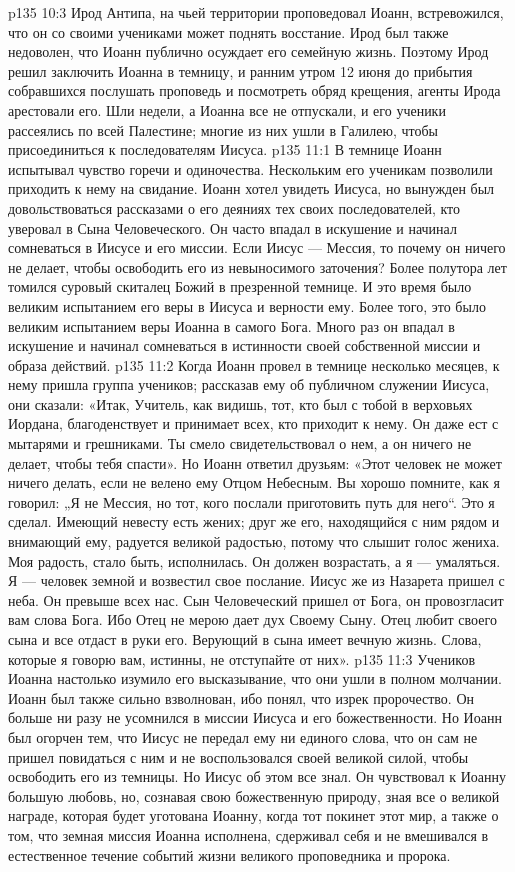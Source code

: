 \vs p135 10:3 Ирод Антипа, на чьей территории проповедовал Иоанн, встревожился, что он со своими учениками может поднять восстание. Ирод был также недоволен, что Иоанн публично осуждает его семейную жизнь. Поэтому Ирод решил заключить Иоанна в темницу, и ранним утром 12 июня до прибытия собравшихся послушать проповедь и посмотреть обряд крещения, агенты Ирода арестовали его. Шли недели, а Иоанна все не отпускали, и его ученики рассеялись по всей Палестине; многие из них ушли в Галилею, чтобы присоединиться к последователям Иисуса.
\vs p135 11:1 В темнице Иоанн испытывал чувство горечи и одиночества. Нескольким его ученикам позволили приходить к нему на свидание. Иоанн хотел увидеть Иисуса, но вынужден был довольствоваться рассказами о его деяниях тех своих последователей, кто уверовал в Сына Человеческого. Он часто впадал в искушение и начинал сомневаться в Иисусе и его миссии. Если Иисус --- Мессия, то почему он ничего не делает, чтобы освободить его из невыносимого заточения? Более полутора лет томился суровый скиталец Божий в презренной темнице. И это время было великим испытанием его веры в Иисуса и верности ему. Более того, это было великим испытанием веры Иоанна в самого Бога. Много раз он впадал в искушение и начинал сомневаться в истинности своей собственной миссии и образа действий.
\vs p135 11:2 \pc Когда Иоанн провел в темнице несколько месяцев, к нему пришла группа учеников; рассказав ему об публичном служении Иисуса, они сказали: «Итак, Учитель, как видишь, тот, кто был с тобой в верховьях Иордана, благоденствует и принимает всех, кто приходит к нему. Он даже ест с мытарями и грешниками. Ты смело свидетельствовал о нем, а он ничего не делает, чтобы тебя спасти». Но Иоанн ответил друзьям: «Этот человек не может ничего делать, если не велено ему Отцом Небесным. Вы хорошо помните, как я говорил: „Я не Мессия, но тот, кого послали приготовить путь для него“. Это я сделал. Имеющий невесту есть жених; друг же его, находящийся с ним рядом и внимающий ему, радуется великой радостью, потому что слышит голос жениха. Моя радость, стало быть, исполнилась. Он должен возрастать, а я --- умаляться. Я --- человек земной и возвестил свое послание. Иисус же из Назарета пришел с неба. Он превыше всех нас. Сын Человеческий пришел от Бога, он провозгласит вам слова Бога. Ибо Отец не мерою дает дух Своему Сыну. Отец любит своего сына и все отдаст в руки его. Верующий в сына имеет вечную жизнь. Слова, которые я говорю вам, истинны, не отступайте от них».
\vs p135 11:3 \pc Учеников Иоанна настолько изумило его высказывание, что они ушли в полном молчании. Иоанн был также сильно взволнован, ибо понял, что изрек пророчество. Он больше ни разу не усомнился в миссии Иисуса и его божественности. Но Иоанн был огорчен тем, что Иисус не передал ему ни единого слова, что он сам не пришел повидаться с ним и не воспользовался своей великой силой, чтобы освободить его из темницы. Но Иисус об этом все знал. Он чувствовал к Иоанну большую любовь, но, сознавая свою божественную природу, зная все о великой награде, которая будет уготована Иоанну, когда тот покинет этот мир, а также о том, что земная миссия Иоанна исполнена, сдерживал себя и не вмешивался в естественное течение событий жизни великого проповедника и пророка.
